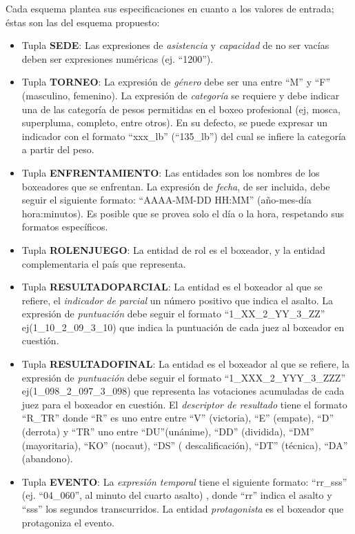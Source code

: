     Cada esquema plantea sus especificaciones en cuanto a los valores de entrada; éstas son las del esquema propuesto:

    \begin{itemize}
        \item Tupla \textbf{SEDE}: Las expresiones de \textit{asistencia} y \textit{capacidad} de no ser vacías deben ser expresiones numéricas (ej. “1200”).
        \item Tupla \textbf{TORNEO}: La expresión de \textit{género} debe ser una entre “M” y “F” (masculino, femenino). La expresión de \textit{categoría} se requiere 
        y debe indicar una de las categoría de pesos permitidas en el boxeo profesional (ej, mosca, superpluma, completo, entre otros). En su defecto, se puede expresar un indicador con 
        el formato “xxx\_lb” (“135\_lb”) del cual se infiere la categoría a partir del peso.
        \item Tupla \textbf{ENFRENTAMIENTO}: Las entidades son los nombres de los boxeadores que se enfrentan. La expresión de \textit{fecha}, de ser incluida, debe seguir
        el siguiente formato: “AAAA-MM-DD HH:MM” (año-mes-día hora:minutos). Es posible que se provea solo el día o la hora, respetando sus formatos específicos.
        \item Tupla \textbf{ROLENJUEGO}: La entidad de rol es el boxeador, y la entidad complementaria el país que representa.
        \item Tupla \textbf{RESULTADOPARCIAL}: La entidad es el boxeador al que se refiere, el \textit{indicador de parcial} un número positivo que indica el asalto. La expresión de \textit{puntuación} 
        debe seguir el formato  “1\_XX\_2\_YY\_3\_ZZ” ej(1\_10\_2\_09\_3\_10) que indica la puntuación de cada juez al boxeador en cuestión.
        \item Tupla \textbf{RESULTADOFINAL}: La entidad es el boxeador al que se refiere, la expresión de \textit{puntuación} debe seguir el formato  “1\_XXX\_2\_YYY\_3\_ZZZ” ej(1\_098\_2\_097\_3\_098)
        que representa las votaciones acumuladas de cada juez para el boxeador en cuestión. El \textit{descriptor de resultado} tiene el formato “R\_TR” donde “R” es uno entre entre “V” (victoria), “E” (empate),
        “D” (derrota) y “TR” uno entre “DU”(unánime), “DD” (dividida), “DM” (mayoritaria), “KO” (nocaut), “DS” ( descalificación), “DT” (técnica), “DA” (abandono).
        \item Tupla \textbf{EVENTO}: La \textit{expresión temporal} tiene el siguiente formato: “rr\_sss” (ej. “04\_060”, al minuto del cuarto asalto) , donde “rr” indica el asalto y “sss” los segundos transcurridos. 
        La entidad \textit{protagonista} es el boxeador que protagoniza el evento.
    \end{itemize}


